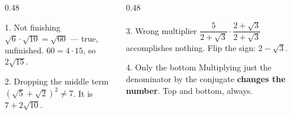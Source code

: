\documentclass[aspectratio=169, 11pt]{beamer}
\begin{document}
\begin{frame}[t, plain]
  \begin{columns}[T]
    \begin{column}{0.48\textwidth}
      \footnotesize
      \begin{block}{1. Not finishing}
        $\sqrt6\cdot\sqrt{10}=\sqrt{60}$ --- true, unfinished. \; $60=4\cdot15$, so $2\sqrt{15}$.
      \end{block}
      \vspace{4pt}
      \begin{block}{2. Dropping the middle term}
        $\left(\sqrt5+\sqrt2\right)^{2}\ne7$. \; It is $7+2\sqrt{10}$.
      \end{block}
    \end{column}
    \begin{column}{0.48\textwidth}
      \footnotesize
      \begin{block}{3. Wrong multiplier}
        $\dfrac{5}{2+\sqrt3}\cdot\dfrac{2+\sqrt3}{2+\sqrt3}$ accomplishes nothing. Flip the sign:
        $2-\sqrt3$.
      \end{block}
      \vspace{4pt}
      \begin{block}{4. Only the bottom}
        Multiplying just the denominator by the conjugate \textbf{changes the number}. Top and
        bottom, always.
      \end{block}
    \end{column}
  \end{columns}
\end{frame}
\end{document}
